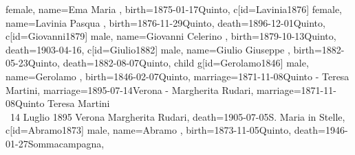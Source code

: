 \documentclass{article}
\begin{document}
\begin{midpage}
\begin{center}
\begin{genealogypicture}
{{{{{{{{{{                                        female,
                                        name={Ema Maria },
                                        birth={1875-01-17}{Quinto},
                                    }
                                    c[id=Lavinia1876]{
                                        female,
                                        name={Lavinia Pasqua },
                                        birth={1876-11-29}{Quinto},
                                        death={1896-12-01}{Quinto},
                                    }
                                    c[id=Giovanni1879]{
                                        male,
                                        name={Giovanni Celerino },
                                        birth={1879-10-13}{Quinto},
                                        death={1903-04-16}{},
                                    }
                                    c[id=Giulio1882]{
                                        male,
                                        name={Giulio Giuseppe },
                                        birth={1882-05-23}{Quinto},
                                        death={1882-08-07}{Quinto},
                                    }
                                }
                                child{
                                    g[id=Gerolamo1846]{
                                        male,
                                        name={Gerolamo },
                                        birth={1846-02-07}{Quinto},
                                        marriage={1871-11-08}{Quinto - Teresa Martini},
                                        marriage={1895-07-14}{Verona - Margherita Rudari},
                                        marriage={1871-11-08}{Quinto \newline Teresa Martini \\ \gtrsymMarried~14 Luglio 1895 \newline \hspace*{3mm} Verona \newline \hspace*{3mm} Margherita Rudari},
                                        death={1905-07-05}{S. Maria in Stelle},
                                    }
                                    c[id=Abramo1873]{
                                        male,
                                        name={Abramo },
                                        birth={1873-11-05}{Quinto},
                                        death={1946-01-27}{Sommacampagna},
}}}}}}}}}}
\end{genealogypicture}
\end{center}
\end{midpage}
\end{document}
